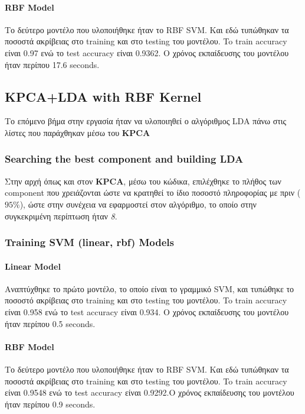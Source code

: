 \paragraph{RBF Model}

Το δεύτερο μοντέλο που υλοποιήθηκε ήταν το RBF SVM. Και εδώ τυπώθηκαν τα ποσοστά
ακρίβειας στο training και στο testing του μοντέλου. To train accuracy είναι 0.97 ενώ το test accuracy είναι 0.9362. Ο χρόνος εκπαίδευσης του μοντέλου ήταν περίπου 17.6 seconds.
\newpage

\subsection{KPCA+LDA with RBF Kernel}

Το επόμενο βήμα στην εργασία ήταν να υλοποιηθεί ο αλγόριθμος LDA πάνω στις λίστες που παράχθηκαν μέσω του \textbf{KPCA}
\subsubsection{Searching the best component  and building LDA  }

Στην αρχή όπως και στον \textbf{KPCA}, μέσω του κώδικα, επιλέχθηκε το πλήθος των component που χρειάζονται ώστε να κρατηθεί το ίδιο ποσοστό πληροφορίας με πριν ($95\%$), ώστε στην συνέχεια να εφαρμοστεί στον αλγόριθμο, το οποίο στην συγκεκριμένη περίπτωση ήταν \emph{8}.

\subsubsection{Training SVM (linear, rbf) Models}

\paragraph{Linear Model}

Αναπτύχθηκε το πρώτο μοντέλο, το οποίο είναι το γραμμικό SVM, και
τυπώθηκε το ποσοστό ακρίβειας στο training και στο testing του μοντέλου. To train accuracy είναι 0.958 ενώ το test
accuracy είναι 0.934. Ο χρόνος εκπαίδευσης του μοντέλου ήταν περίπου 0.5 seconds.

\paragraph{RBF Model}

Το δεύτερο μοντέλο που υλοποιήθηκε ήταν το RBF SVM. Και εδώ τυπώθηκαν τα ποσοστά
ακρίβειας στο training και στο testing του μοντέλου. To train accuracy είναι 0.9548 ενώ το test accuracy είναι 0.9292.Ο χρόνος εκπαίδευσης του μοντέλου ήταν περίπου 0.9 seconds.
\clearpage
